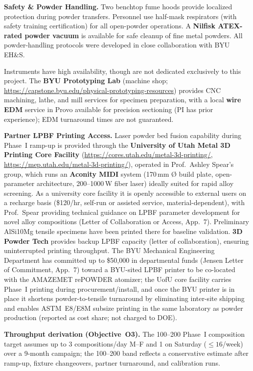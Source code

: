 \documentclass[11pt,letterpaper]{article}
\begin{document}
\textbf{Safety \& Powder Handling.}
Two benchtop fume hoods provide localized protection during powder
transfers.  Personnel use half-mask respirators (with safety training
certification) for all open-powder operations.  A \textbf{Nilfisk
ATEX-rated powder vacuum} is available for safe cleanup of fine metal
powders.  All powder-handling protocols were developed in close
collaboration with BYU EH\&S.

Instruments have high availability, though are not dedicated
exclusively to this project.
The \textbf{BYU Prototyping Lab} (machine shop;
\url{https://capstone.byu.edu/physical-prototyping-resources}) provides CNC
machining, lathe, and mill services for specimen preparation, with a local
\textbf{wire EDM} service in Provo available for precision sectioning (PI has
prior experience); EDM turnaround times are not guaranteed.

\textbf{Partner LPBF Printing Access.}
Laser powder bed fusion capability during Phase~I ramp-up is provided through
the \textbf{University of Utah Metal 3D Printing Core Facility}
(\url{https://cores.utah.edu/metal-3d-printing/},
\url{https://mep.utah.edu/metal-3d-printing/}), operated in Prof.\ Ashley
Spear's group, which runs an \textbf{Aconity MIDI} system (170\,mm
\textsf{\O} build plate, open-parameter architecture, 200--1000\,W fiber
laser) ideally suited for rapid alloy screening.  As a university core
facility it is openly accessible to external users on a recharge basis
(\$120/hr, self-run or assisted service, material-dependent), with Prof.\
Spear providing technical guidance on LPBF parameter development for novel
alloy compositions (Letter of Collaboration or Access, App.~7).  Preliminary
AlSi10Mg tensile specimens have been printed there for baseline validation.
\textbf{3D Powder Tech} provides backup LPBF capacity (letter of collaboration),
ensuring uninterrupted printing throughput.
The BYU Mechanical Engineering Department has committed up to \$50{,}000 in
departmental funds (Jensen Letter of Commitment, App.~7) toward a BYU-sited
LPBF printer to be co-located with the AMAZEMET rePOWDER atomizer; the UofU
core facility carries Phase~I printing during procurement/install, and once
the BYU printer is in place it shortens powder-to-tensile turnaround by
eliminating inter-site shipping and enables ASTM~E8/E8M subsize printing in
the same laboratory as powder production (reported as cost share; not
charged to DOE).

\textbf{Throughput derivation (Objective~O3).}
The 100--200 Phase~I composition target assumes up to 3 compositions/day
M--F and 1 on Saturday (${\leq}16$/week) over a 9-month campaign;
the 100--200 band reflects a conservative estimate
after ramp-up, fixture changeovers, partner turnaround, and
calibration runs.
\end{document}

